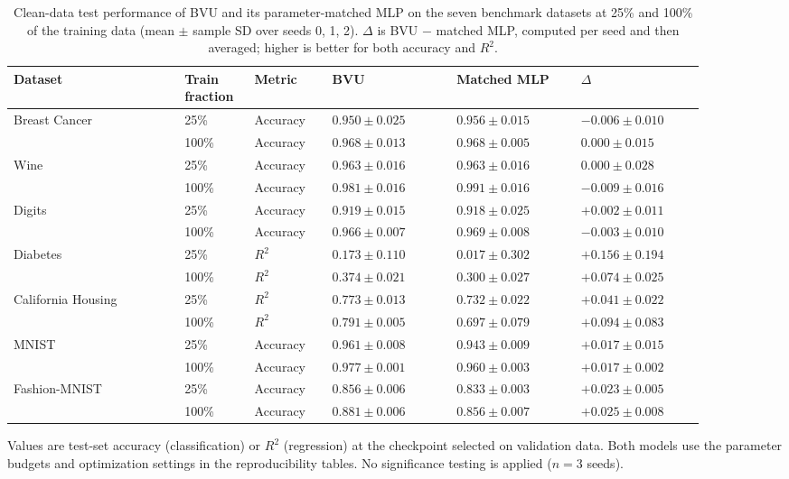 \begingroup
\small
\setlength{\tabcolsep}{4pt}
\renewcommand{\arraystretch}{1.12}

\begin{table}[t]
\centering
\caption{Clean-data test performance of BVU and its parameter-matched MLP on the seven benchmark datasets at 25\% and 100\% of the training data (mean $\pm$ sample SD over seeds 0, 1, 2). $\Delta$ is BVU $-$ matched MLP, computed per seed and then averaged; higher is better for both accuracy and $R^2$.}
\label{tab:clean_performance}
\begin{tabular}{@{}p{0.22\linewidth}p{0.09\linewidth}p{0.10\linewidth}p{0.16\linewidth}p{0.16\linewidth}p{0.16\linewidth}@{}}
\toprule
Dataset & Train fraction & Metric & BVU & Matched MLP & $\Delta$ \\
\midrule
Breast Cancer & 25\% & Accuracy & $0.950 \pm 0.025$ & $0.956 \pm 0.015$ & $-0.006 \pm 0.010$ \\
 & 100\% & Accuracy & $0.968 \pm 0.013$ & $0.968 \pm 0.005$ & $0.000 \pm 0.015$ \\
\addlinespace[2pt]
Wine & 25\% & Accuracy & $0.963 \pm 0.016$ & $0.963 \pm 0.016$ & $0.000 \pm 0.028$ \\
 & 100\% & Accuracy & $0.981 \pm 0.016$ & $0.991 \pm 0.016$ & $-0.009 \pm 0.016$ \\
\addlinespace[2pt]
Digits & 25\% & Accuracy & $0.919 \pm 0.015$ & $0.918 \pm 0.025$ & $+0.002 \pm 0.011$ \\
 & 100\% & Accuracy & $0.966 \pm 0.007$ & $0.969 \pm 0.008$ & $-0.003 \pm 0.010$ \\
\addlinespace[2pt]
Diabetes & 25\% & $R^2$ & $0.173 \pm 0.110$ & $0.017 \pm 0.302$ & $+0.156 \pm 0.194$ \\
 & 100\% & $R^2$ & $0.374 \pm 0.021$ & $0.300 \pm 0.027$ & $+0.074 \pm 0.025$ \\
\addlinespace[2pt]
California Housing & 25\% & $R^2$ & $0.773 \pm 0.013$ & $0.732 \pm 0.022$ & $+0.041 \pm 0.022$ \\
 & 100\% & $R^2$ & $0.791 \pm 0.005$ & $0.697 \pm 0.079$ & $+0.094 \pm 0.083$ \\
\addlinespace[2pt]
MNIST & 25\% & Accuracy & $0.961 \pm 0.008$ & $0.943 \pm 0.009$ & $+0.017 \pm 0.015$ \\
 & 100\% & Accuracy & $0.977 \pm 0.001$ & $0.960 \pm 0.003$ & $+0.017 \pm 0.002$ \\
\addlinespace[2pt]
Fashion-MNIST & 25\% & Accuracy & $0.856 \pm 0.006$ & $0.833 \pm 0.003$ & $+0.023 \pm 0.005$ \\
 & 100\% & Accuracy & $0.881 \pm 0.006$ & $0.856 \pm 0.007$ & $+0.025 \pm 0.008$ \\
\bottomrule
\end{tabular}
\parbox{0.98\linewidth}{\footnotesize Values are test-set accuracy (classification) or $R^2$ (regression) at the checkpoint selected on validation data. Both models use the parameter budgets and optimization settings in the reproducibility tables. No significance testing is applied ($n=3$ seeds).}
\end{table}
\endgroup
